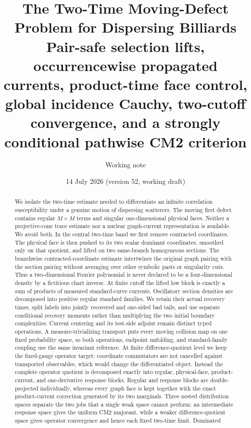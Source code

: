 \documentclass[11pt]{article}
\title{The Two-Time Moving-Defect Problem for Dispersing Billiards\\
\large Pair-safe selection lifts, occurrencewise propagated currents,
product-time face control,
global incidence Cauchy,
two-cutoff convergence, and a strongly conditional
pathwise CM2 criterion}
\author{Working note}
\date{14 July 2026 (version 52, working draft)}
\begin{document}
\maketitle

\begin{abstract}\sloppy
We isolate the two-time estimate needed to differentiate an infinite
correlation susceptibility under a genuine motion of dispersing scatterers.
The moving first defect contains regular $M\times M$ terms and singular
one-dimensional physical faces.  Neither a projective-cone trace estimate nor
a nuclear graph-current representation is available.  We avoid both.  In the
central two-time band we first remove contracted coordinates.  The physical
face is then pushed to its two scalar dominant coordinates, smoothed only on
that quotient, and lifted on two same-branch homogeneous sections.  The
branchwise contracted-coordinate estimate intertwines the original graph
pairing with the section pairing without averaging over other symbolic pasts
or singularity cuts.  Thus a two-dimensional Fourier polynomial is never
declared to be a four-dimensional density by a fictitious chart inverse.  At
finite cutoff the lifted low block is exactly a sum of products of measured
standard-curve currents.  Oscillatory section densities are decomposed into
positive regular standard families.  We retain their actual recovery times,
split labels into jointly recovered and one-sided bad tails, and use separate
conditional recovery moments rather than multiplying the two initial boundary
complexities.  Current centering and its test-side adjoint remain
distinct typed operations.  A measure-trivializing transport puts every
moving collision map on one fixed probability space, so both operations,
endpoint unfolding, and standard-family coupling use the same invariant
reference.  At finite difference-quotient level we keep the fixed-gauge
operator target: coordinate commutators are not cancelled against transported
observables, which would change the differentiated object.  Instead the
complete operator quotient is decomposed exactly into regular, physical-face,
product-current, and one-derivative response blocks.  Regular and response
blocks are double-projected individually, whereas every graph face is kept
together with the exact product-current correction generated by its two
marginals.  Three nested distribution spaces separate the two
jobs that a single weak space cannot perform: an intermediate response space
gives the uniform CM2 majorant, while a weaker difference-quotient space gives
operator convergence and hence each fixed two-time limit.  Dominated

\end{abstract}
\end{document}

